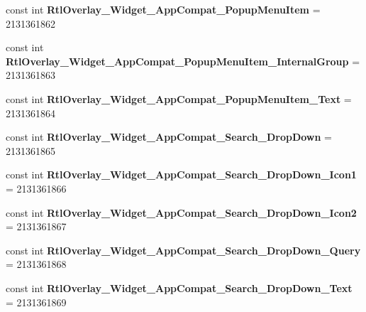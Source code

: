 \begin{DoxyCompactItemize}
const int {\bfseries Rtl\+Overlay\+\_\+\+Widget\+\_\+\+App\+Compat\+\_\+\+Popup\+Menu\+Item} = 2131361862
\item 
\mbox{\label{class_pinned_app_1_1_droid_1_1_resource_1_1_style_acfe19a9b303aa96259a60d7cbad2d9d3}} 
const int {\bfseries Rtl\+Overlay\+\_\+\+Widget\+\_\+\+App\+Compat\+\_\+\+Popup\+Menu\+Item\+\_\+\+Internal\+Group} = 2131361863
\item 
\mbox{\label{class_pinned_app_1_1_droid_1_1_resource_1_1_style_a0dbec007f5db2c67aaf44019347c848b}} 
const int {\bfseries Rtl\+Overlay\+\_\+\+Widget\+\_\+\+App\+Compat\+\_\+\+Popup\+Menu\+Item\+\_\+\+Text} = 2131361864
\item 
\mbox{\label{class_pinned_app_1_1_droid_1_1_resource_1_1_style_a8e1f9ced93201095dccf60c06005d4c6}} 
const int {\bfseries Rtl\+Overlay\+\_\+\+Widget\+\_\+\+App\+Compat\+\_\+\+Search\+\_\+\+Drop\+Down} = 2131361865
\item 
\mbox{\label{class_pinned_app_1_1_droid_1_1_resource_1_1_style_af9d166c738b8833ba80a9710a3981d05}} 
const int {\bfseries Rtl\+Overlay\+\_\+\+Widget\+\_\+\+App\+Compat\+\_\+\+Search\+\_\+\+Drop\+Down\+\_\+\+Icon1} = 2131361866
\item 
\mbox{\label{class_pinned_app_1_1_droid_1_1_resource_1_1_style_a14141f5c00505b566716601198340f2f}} 
const int {\bfseries Rtl\+Overlay\+\_\+\+Widget\+\_\+\+App\+Compat\+\_\+\+Search\+\_\+\+Drop\+Down\+\_\+\+Icon2} = 2131361867
\item 
\mbox{\label{class_pinned_app_1_1_droid_1_1_resource_1_1_style_a97609214b44a0a077a82c391b714f882}} 
const int {\bfseries Rtl\+Overlay\+\_\+\+Widget\+\_\+\+App\+Compat\+\_\+\+Search\+\_\+\+Drop\+Down\+\_\+\+Query} = 2131361868
\item 
\mbox{\label{class_pinned_app_1_1_droid_1_1_resource_1_1_style_a9701586818ab62c1fa3bfe149812dc7b}} 
const int {\bfseries Rtl\+Overlay\+\_\+\+Widget\+\_\+\+App\+Compat\+\_\+\+Search\+\_\+\+Drop\+Down\+\_\+\+Text} = 2131361869

\end{DoxyCompactItemize}

